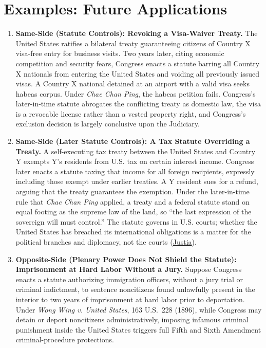 \documentclass[12pt]{article}
\begin{document}
\section{Examples: Future Applications}
\begin{enumerate}

\item \textbf{Same-Side (Statute Controls): Revoking a Visa-Waiver Treaty.} The United States ratifies a bilateral treaty guaranteeing citizens of Country X visa-free entry for business visits. Two years later, citing economic competition and security fears, Congress enacts a statute barring all Country X nationals from entering the United States and voiding all previously issued visas. A Country X national detained at an airport with a valid visa seeks habeas corpus. Under \textit{Chae Chan Ping}, the habeas petition fails. Congress's later-in-time statute abrogates the conflicting treaty as domestic law, the visa is a revocable license rather than a vested property right, and Congress's exclusion decision is largely conclusive upon the Judiciary.

\item \textbf{Same-Side (Later Statute Controls): A Tax Statute Overriding a Treaty.} A self-executing tax treaty between the United States and Country Y exempts Y's residents from U.S. tax on certain interest income. Congress later enacts a statute taxing that income for all foreign recipients, expressly including those exempt under earlier treaties. A Y resident sues for a refund, arguing that the treaty guarantees the exemption. Under the later-in-time rule that \textit{Chae Chan Ping} applied, a treaty and a federal statute stand on equal footing as the supreme law of the land, so ``the last expression of the sovereign will must control.'' The statute governs in U.S. courts; whether the United States has breached its international obligations is a matter for the political branches and diplomacy, not the courts (\href{https://supreme.justia.com/cases/federal/us/130/581/}{Justia}).

\item \textbf{Opposite-Side (Plenary Power Does Not Shield the Statute): Imprisonment at Hard Labor Without a Jury.} Suppose Congress enacts a statute authorizing immigration officers, without a jury trial or criminal indictment, to sentence noncitizens found unlawfully present in the interior to two years of imprisonment at hard labor prior to deportation. Under \textit{Wong Wing v. United States}, 163 U.S.\ 228 (1896), while Congress may detain or deport noncitizens administratively, imposing infamous criminal punishment inside the United States triggers full Fifth and Sixth Amendment criminal-procedure protections.


\end{enumerate}
\end{document}
